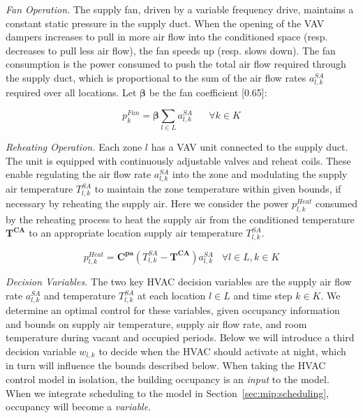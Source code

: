 \noindent\emph{Fan Operation.} The supply fan, driven by a variable frequency drive, maintains a constant static pressure in the supply
duct. When the opening of the VAV dampers increases to pull in more air flow into the conditioned space (resp. decreases to pull less air
flow), the fan speeds up (resp. slows down). The fan consumption is the power consumed to push the total air flow required through the
supply duct, which is proportional to the sum of the air flow rates $a^{SA}_{l,k}$ required over all locations. Let $\bm \beta$ be the fan
coefficient [0.65]: 

\begin{equation} \label{eq:p_fan}
p_{k}^{Fan} = \bm{\beta} \sum\limits_{l \in L} a_{l,k}^{SA} \hspace{20pt}  \forall k \in K
\end{equation}

\noindent\emph{Reheating Operation.} Each zone $l$ has a VAV unit connected to the supply duct. The unit is equipped with
continuously adjustable valves and reheat coils. These enable regulating the air flow rate $a^{SA}_{l,k}$ into the zone and
modulating the supply air temperature $T^{SA}_{l,k}$ to maintain the zone temperature within given bounds, if necessary by reheating the
supply air. Here we consider the power $p_{l,k}^{Heat}$ consumed by the reheating process to heat the supply air from the conditioned
temperature $\bm{T^{CA}}$ to an appropriate location supply air temperature $T_{l,k}^{SA}$.  

\begin{equation} \label{eq:p_heat} 
p_{l,k}^{Heat} = \bm{C^{pa}} (T_{l,k}^{SA}- \bm{T^{CA}}) a_{l,k}^{SA} \hspace{10pt} \forall l \in L,k \in K 
\end{equation}

\noindent\emph{Decision Variables.} The two key HVAC decision variables are the supply air flow rate $a_{l,k}^{SA}$ and
temperature $T_{l,k}^{SA}$ at each location $l \in L$ and time step $k\in K$. We determine an optimal control for these variables, given
occupancy information and bounds on supply air temperature, supply air flow rate, and room temperature during vacant and occupied
periods. Below we will introduce a third decision variable $w_{l,k}$ to decide when the HVAC should activate at night, which in turn will influence the bounds described below. When taking the HVAC control model in isolation, the building occupancy is an {\em input} to the model. When we integrate scheduling to the model in Section~\ref{sec:mip:scheduling}, occupancy will become a {\em variable}.

